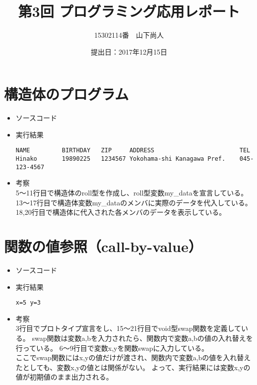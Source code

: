 \documentclass[a4paper]{jsarticle}
\title{第3回 プログラミング応用レポート}
\author{15302114番　山下尚人}
\date{提出日：2017年12月15日}
\begin{document}
\maketitle%

\section{構造体のプログラム}
	\begin{itemize}
	\item ソースコード
		 
		\mbox{}\newline
	\item 実行結果
		\begin{lstlisting}
NAME         BIRTHDAY   ZIP     ADDRESS                        TEL
Hinako       19890225   1234567 Yokohama-shi Kanagawa Pref.    045-123-4567
		\end{lstlisting}
		\mbox{}\newline
	\item 考察\mbox{}\\
		5〜11行目で構造体のroll型を作成し、roll型変数my\_dataを宣言している。
		13〜17行目で構造体変数my\_dataのメンバに実際のデータを代入している。
		18,20行目で構造体に代入された各メンバのデータを表示している。
	\end{itemize}


\section{関数の値参照（call-by-value）}
	\begin{itemize}
	\item ソースコード
		
		\mbox{}\newline
	\item 実行結果
		\begin{lstlisting}
x=5	y=3
		\end{lstlisting}
		\mbox{}\newline
	\item 考察\mbox{}\\
		3行目でプロトタイプ宣言をし、15〜21行目でvoid型swap関数を定義している。
		swap関数は変数a,bを入力されたら、関数内で変数a,bの値の入れ替えを行っている。
		6〜9行目で変数x,yを関数swapに入力している。\\
		ここでswap関数にはx,yの値だけが渡され、関数内で変数a,bの値を入れ替えたとしても、変数x,yの値とは関係がない。
		よって、実行結果には変数x,yの値が初期値のまま出力される。
	\end{itemize}
	\newpage	%
\end{document}
